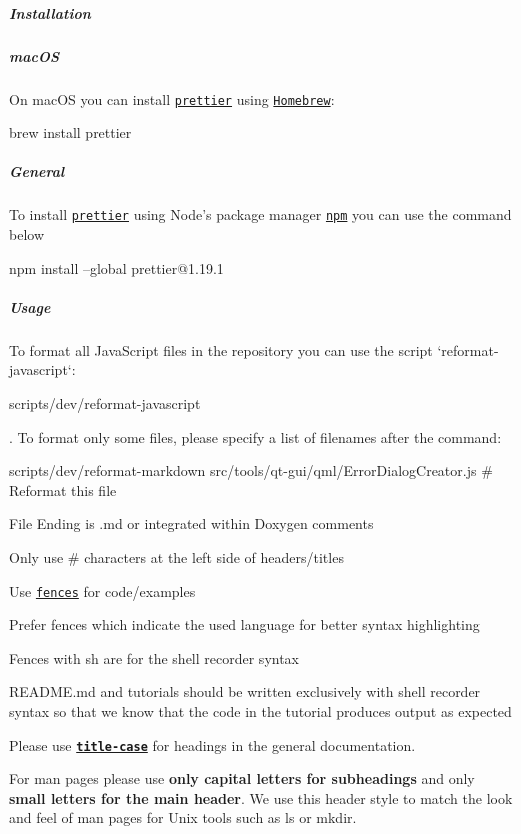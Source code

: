 \label{invalid_invalid}%
%
\subparagraph*{Installation}

\subparagraph*{mac\+OS}

On mac\+OS you can install \href{https://prettier.io}{\tt {\ttfamily prettier}} using \href{https://brew.sh}{\tt Homebrew}\+:


\begin{DoxyCode}
brew install prettier
\end{DoxyCode}


\subparagraph*{General}

To install \href{https://prettier.io}{\tt {\ttfamily prettier}} using Node’s package manager \href{https://www.npmjs.com}{\tt npm} you can use the command below


\begin{DoxyCode}
npm install --global prettier@1.19.1
\end{DoxyCode}


\label{invalid_invalid}%
%
\subparagraph*{Usage}

To format all Java\+Script files in the repository you can use the script `reformat-\/javascript`\+:


\begin{DoxyCode}
scripts/dev/reformat-javascript
\end{DoxyCode}


. To format only some files, please specify a list of filenames after the command\+:


\begin{DoxyCode}
scripts/dev/reformat-markdown src/tools/qt-gui/qml/ErrorDialogCreator.js # Reformat this file
\end{DoxyCode}



\begin{DoxyItemize}
\item File Ending is {\ttfamily .md} or integrated within Doxygen comments
\item Only use {\ttfamily \#} characters at the left side of headers/titles
\item Use \href{https://help.github.com/en/articles/creating-and-highlighting-code-blocks}{\tt fences} for code/examples
\item Prefer fences which indicate the used language for better syntax highlighting
\item Fences with sh are for the shell recorder syntax
\item {\ttfamily R\+E\+A\+D\+M\+E.\+md} and tutorials should be written exclusively with shell recorder syntax so that we know that the code in the tutorial produces output as expected
\item Please use \href{https://en.wiktionary.org/wiki/title_case}{\tt {\bfseries title-\/case}} for headings in the general documentation.
\item For man pages please use {\bfseries only capital letters for subheadings} and only {\bfseries small letters for the main header}. We use this header style to match the look and feel of man pages for Unix tools such as {\ttfamily ls} or {\ttfamily mkdir}.
\end{DoxyItemize}

